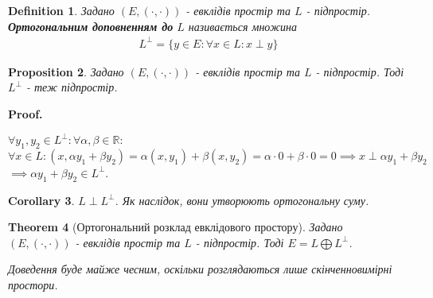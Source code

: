 \documentclass[a4paper, 10pt]{article}
\makeatletter
\theoremstyle{theoremdd}
\newtheorem{theorem}{Theorem}[subsection]
\newtheorem{definition}[theorem]{Definition}
\newtheorem{proposition}[theorem]{Proposition}
\newtheorem{corollary}[theorem]{Corollary}
\renewenvironment{proof}[1][Proof.\\]{\par
\pushQED{\hfill \qed}%
\normalfont \topsep6\p@\@plus6\p@\relax
\trivlist
\item\relax
{\bfseries
#1\@addpunct{.}}\hspace\labelsep\ignorespaces
}{%
\popQED\endtrivlist\@endpefalse
}
\makeatother
\begin{document}
\begin{definition}
Задано $(E, (\cdot,\cdot))$ - евклідів простір та $L$ - підпростір.\\
\textbf{Ортогональним доповненням до} $L$ називається множина
\begin{align*}
L^{\perp} = \{y \in E: \forall x \in L: x \perp y\}
\end{align*}
\end{definition}

\begin{proposition}
Задано $(E, (\cdot,\cdot))$ - евклідів простір та $L$ - підпростір. Тоді $L^{\perp}$ - теж підпростір.
\end{proposition}

\begin{proof}
$\forall y_1,y_2 \in L^{\perp}: \forall \alpha,\beta \in \mathbb{R}:$\\
$\forall x \in L: (x, \alpha y_1+ \beta y_2) = \alpha (x,y_1) + \beta (x,y_2) = \alpha \cdot 0 + \beta \cdot 0 = 0 \implies x \perp \alpha y_1 + \beta y_2$\\
$\implies \alpha y_1 + \beta y_2 \in L^{\perp}$.
\end{proof}

\begin{corollary}
$L \perp L^\perp$. Як наслідок, вони утворюють ортогональну суму.
\end{corollary}

\begin{theorem}[Ортогональний розклад евклідового простору]
Задано $(E, (\cdot,\cdot))$ - евклідів простір та $L$ - підпростір.
Тоді $E = L \bigoplus L^{\perp}$.
\end{theorem}
\noindent
\textit{Доведення буде майже чесним, оскільки розглядаються лише скінченновимірні простори.}
\end{document}
